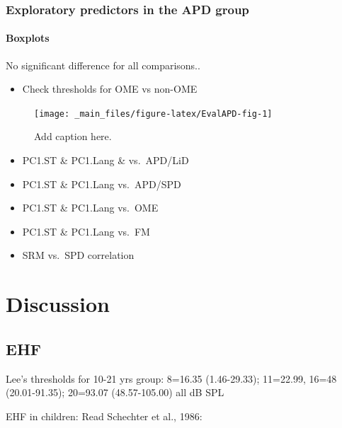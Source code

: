 \documentclass[a4paper, twoside]{templates/ociamthesis}
\providecommand{\tightlist}{%
  \setlength{\itemsep}{0pt}\setlength{\parskip}{0pt}}
\begin{document}
\hypertarget{exploratory-predictors-in-the-apd-group}{%
\subsubsection{Exploratory predictors in the APD group}\label{exploratory-predictors-in-the-apd-group}}

\hypertarget{boxplots}{%
\paragraph{Boxplots}\label{boxplots}}

No significant difference for all comparisons..

\begin{itemize}
\tightlist
\item
  Check thresholds for OME vs non-OME
\end{itemize}

\begin{figure}

{\centering \texttt{[image: \_main\_files/figure-latex/EvalAPD-fig-1]} 

}

\caption{Add caption here.}\label{fig:EvalAPD-fig}
\end{figure}

\begin{itemize}
\item
  PC1.ST \& PC1.Lang \& vs.~APD/LiD
\item
  PC1.ST \& PC1.Lang vs.~APD/SPD
\item
  PC1.ST \& PC1.Lang vs.~OME
\item
  PC1.ST \& PC1.Lang vs.~FM
\item
  SRM vs.~SPD correlation
\end{itemize}

\hypertarget{discussion-4}{%
\section{Discussion}\label{discussion-4}}

\hypertarget{ehf}{%
\subsection{EHF}\label{ehf}}

Lee's thresholds for 10-21 yrs group: 8=16.35 (1.46-29.33); 11=22.99, 16=48 (20.01-91.35); 20=93.07 (48.57-105.00) all dB SPL

EHF in children: Read Schechter et al., 1986:
\end{document}
